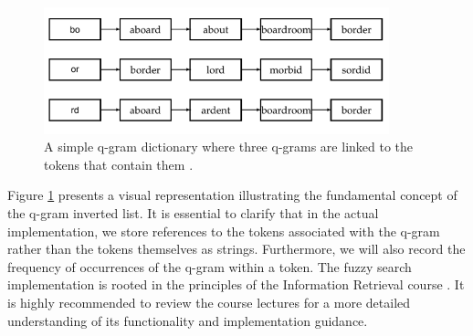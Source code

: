 \begin{figure}[h]	
     \centering
         \includegraphics[width=10cm]{figures/q-gram.png}
              \caption{A simple q-gram dictionary where three q-grams are linked to the tokens that contain them \cite{manning2008}.}
     \label{fig:q-gram-example}
\end{figure}

Figure \ref{fig:q-gram-example} presents a visual representation illustrating the fundamental concept of the q-gram inverted list. It is essential to clarify that in the actual implementation, we store references to the tokens associated with the q-gram rather than the tokens themselves as strings. Furthermore, we will also record the frequency of occurrences of the q-gram within a token. The fuzzy search implementation is rooted in the principles of the Information Retrieval course \cite{freiburg2023ir}. It is highly recommended to review the course lectures for a more detailed understanding of its functionality and implementation guidance.